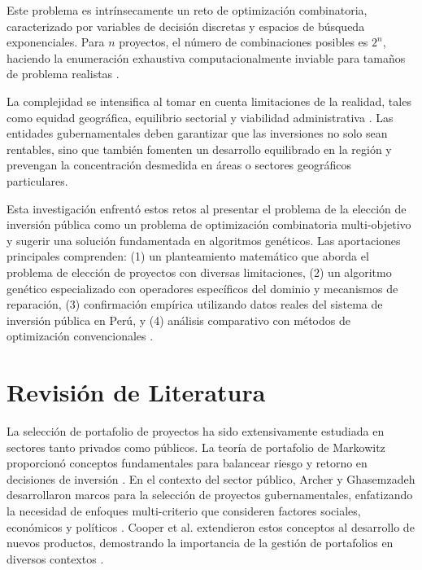 \documentclass[12pt,a4paper]{article}
\begin{document}
Este problema es intrínsecamente un reto de optimización combinatoria, caracterizado por variables de decisión discretas y espacios de búsqueda exponenciales. Para $n$ proyectos, el número de combinaciones posibles es $2^n$, haciendo la enumeración exhaustiva computacionalmente inviable para tamaños de problema realistas \cite{garey1979}.

La complejidad se intensifica al tomar en cuenta limitaciones de la realidad, tales como equidad geográfica, equilibrio sectorial y viabilidad administrativa \cite{khalilpourazari2021}. Las entidades gubernamentales deben garantizar que las inversiones no solo sean rentables, sino que también fomenten un desarrollo equilibrado en la región y prevengan la concentración desmedida en áreas o sectores geográficos particulares.

Esta investigación enfrentó estos retos al presentar el problema de la elección de inversión pública como un problema de optimización combinatoria multi-objetivo y sugerir una solución fundamentada en algoritmos genéticos. Las aportaciones principales comprenden: (1) un planteamiento matemático que aborda el problema de elección de proyectos con diversas limitaciones, (2) un algoritmo genético especializado con operadores específicos del dominio y mecanismos de reparación, (3) confirmación empírica utilizando datos reales del sistema de inversión pública en Perú, y (4) análisis comparativo con métodos de optimización convencionales \cite{doerner2004}.

\section{Revisión de Literatura}

\vspace{0.5cm} %
\vspace{0.3cm} %

La selección de portafolio de proyectos ha sido extensivamente estudiada en sectores tanto privados como públicos. La teoría de portafolio de Markowitz proporcionó conceptos fundamentales para balancear riesgo y retorno en decisiones de inversión \cite{markowitz1952}. En el contexto del sector público, Archer y Ghasemzadeh desarrollaron marcos para la selección de proyectos gubernamentales, enfatizando la necesidad de enfoques multi-criterio que consideren factores sociales, económicos y políticos \cite{archer1999}. Cooper et al. extendieron estos conceptos al desarrollo de nuevos productos, demostrando la importancia de la gestión de portafolios en diversos contextos \cite{cooper2001}.
\end{document}
